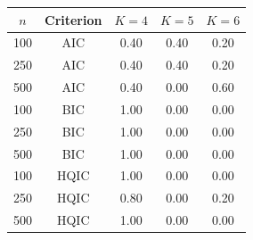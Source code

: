 \begin{tabular}{ccccc}
\hline
$n$ & Criterion & $K=4$ & $K=5$ & $K=6$ \\
\hline
100 & AIC & 0.40 & 0.40 & 0.20 \\
250 & AIC & 0.40 & 0.40 & 0.20 \\
500 & AIC & 0.40 & 0.00 & 0.60 \\
100 & BIC & 1.00 & 0.00 & 0.00 \\
250 & BIC & 1.00 & 0.00 & 0.00 \\
500 & BIC & 1.00 & 0.00 & 0.00 \\
100 & HQIC & 1.00 & 0.00 & 0.00 \\
250 & HQIC & 0.80 & 0.00 & 0.20 \\
500 & HQIC & 1.00 & 0.00 & 0.00 \\
\hline
\end{tabular}
